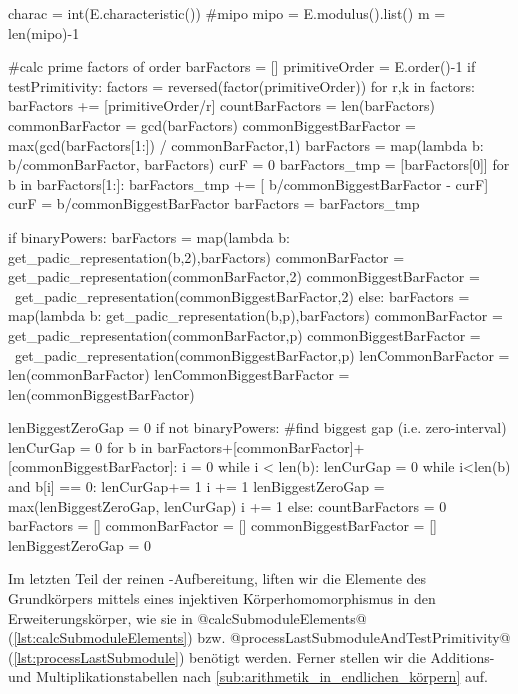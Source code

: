 \begin{sagecode}[caption={\texttt{countCompleteSubmoduleGenerators}
  Fortsetzung (I)}, 
  firstnumber=128]
    charac = int(E.characteristic())
        #mipo
    mipo = E.modulus().list()
    m = len(mipo)-1

    #calc prime factors of order
    barFactors = []
    primitiveOrder = E.order()-1
    if testPrimitivity:
        factors = reversed(factor(primitiveOrder))
        for r,k in factors:
            barFactors += [primitiveOrder/r]
        countBarFactors = len(barFactors)
        commonBarFactor = gcd(barFactors)
        commonBiggestBarFactor = max(gcd(barFactors[1:]) / commonBarFactor,1)
        barFactors = map(lambda b: b/commonBarFactor, barFactors)
        curF = 0
        barFactors_tmp = [barFactors[0]]
        for b in barFactors[1:]:
            barFactors_tmp += [ b/commonBiggestBarFactor - curF]
            curF = b/commonBiggestBarFactor
        barFactors = barFactors_tmp
        
        if binaryPowers:
            barFactors = map(lambda b: get_padic_representation(b,2),barFactors)
            commonBarFactor = get_padic_representation(commonBarFactor,2)
            commonBiggestBarFactor = \
                    get_padic_representation(commonBiggestBarFactor,2)
        else:
            barFactors = map(lambda b: get_padic_representation(b,p),barFactors)
            commonBarFactor = get_padic_representation(commonBarFactor,p)
            commonBiggestBarFactor = \
                    get_padic_representation(commonBiggestBarFactor,p)
        lenCommonBarFactor = len(commonBarFactor)
        lenCommonBiggestBarFactor = len(commonBiggestBarFactor)

        lenBiggestZeroGap = 0
        if not binaryPowers:
            #find biggest gap (i.e. zero-interval)
            lenCurGap = 0
            for b in barFactors+[commonBarFactor]+[commonBiggestBarFactor]:
                i = 0
                while i < len(b):
                    lenCurGap = 0
                    while i<len(b) and b[i] == 0:
                        lenCurGap+= 1
                        i += 1
                    lenBiggestZeroGap = max(lenBiggestZeroGap, lenCurGap)
                    i += 1
    else:
        countBarFactors = 0
        barFactors = []
        commonBarFactor = []
        commonBiggestBarFactor = []
        lenBiggestZeroGap = 0
\end{sagecode}


Im letzten Teil der reinen \sage-Aufbereitung, liften wir die Elemente des
Grundkörpers mittels eines injektiven Körperhomomorphismus in den
Erweiterungskörper, wie sie in @calcSubmoduleElements@
(\autoref{lst:calcSubmoduleElements}) bzw.
@processLastSubmoduleAndTestPrimitivity@
(\autoref{lst:processLastSubmodule}) benötigt werden. Ferner stellen wir die 
Additions- und Multiplikationstabellen nach 
\autoref{sub:arithmetik_in_endlichen_körpern} auf.

